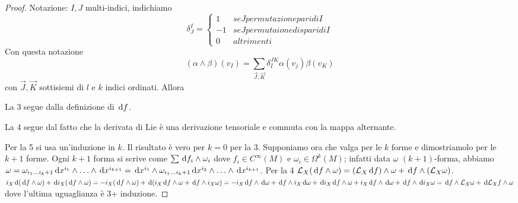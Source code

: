 \begin{proof}
	Notazione: $I,J$ multi-indici, indichiamo
	\begin{equation*}
		\delta_J^I = \begin{cases} %
		             	1 & se J permutazione pari di I\\
		             	-1 & se J permutaione dispari di I\\
		             	0 & altrimenti
		             \end{cases}
	\end{equation*}
	Con questa notazione
	\begin{equation*}
		(\alpha\wedge\beta)(v_I) = \sum_{\vec J, \vec K} \delta_I^{JK} \alpha(v_j)\beta(v_K)
	\end{equation*}
	con $\vec J,\vec K$ sottisiemi di $l$ e $k$ indici ordinati. Allora
	
	La 3 segue dalla definizione di $\,\mathrm d f$.
	
	La 4 segue dal fatto che la derivata di Lie è una derivazione tensoriale e commuta con la mappa alternante.
	
	Per la 5 si usa un'induzione in $k$. Il risultato è vero per $k=0$ per la 3. Supponiamo ora che valga per le $k$ forme e dimostriamolo per le $k+1$ forme. Ogni $k+1$ forma si scrive come $\sum \,\mathrm d f_i \wedge \omega_i$ dove $f_i \in C^\infty(M)$ e $\omega_i\in\Omega^k(M)$; infatti data $\omega$ $(k+1)$-forma, abbiamo
	$\omega = \omega_{i_1 \dots  i_k+1} \,\mathrm d x^{i_1} \wedge \ldots \wedge \,\mathrm d x^{i_{k+1}} = \,\mathrm d x^{i_1} \wedge \omega_{i_1 \dots  i_k+1} \,\mathrm d x^{i_2} \wedge \ldots \wedge \,\mathrm d x^{i_{k+1}}$.
	Per la 4 $\mathcal L_X(\,\mathrm d f\wedge\omega) = (\mathcal L_X\,\mathrm d f)\wedge \omega + \,\mathrm d f \wedge (\mathcal L_X\omega)$.
	$i_X\,\mathrm d (\,\mathrm d f\wedge \omega) + \,\mathrm d i_X(\,\mathrm d f \wedge \omega) = -i_X(\,\mathrm d f\wedge \omega) + \,\mathrm d (i_X\,\mathrm d f \wedge \omega + \,\mathrm d f \wedge i_X\omega) =
	-i_X\,\mathrm d f\wedge \,\mathrm d \omega + \,\mathrm d f\wedge i_X \,\mathrm d \omega + \,\mathrm d i_X \,\mathrm d f \wedge \omega + i_X \,\mathrm d f \wedge \,\mathrm d \omega + \,\mathrm d f \wedge \,\mathrm d i_X \omega
	= \,\mathrm d f \wedge \mathcal L_X\omega + \,\mathrm d \mathcal L_Xf \wedge \omega$
	dove l'ultima uguaglianza è 3+ induzione.
	

\end{proof}
